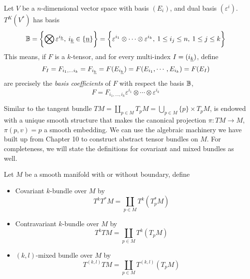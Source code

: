 \documentclass[../main-manifolds.tex]{subfiles}
\begin{document}
\begin{wts}[Basis of {$T^k(V^*)$}]
    Let $V$ be a $n$-dimensional vector space with basis $(E_i)$, and dual basis $(\varepsilon^i)$. $T^K(V^*)$ has basis
    \[
        \borel = \bigset{\bigotimes \varepsilon^{\Ul{i}[k]},\: \Ul{i}[k]\in \{\underline{n}\}} = \bigset{\varepsilon^{i_1}\otimes\cdots\otimes \varepsilon^{i_k},\: 1\leq i_j\leq n,\:  1\leq j\leq k}
    \]
    This means, if $F$ is a $k$-tensor, and for every multi-index $I = (\Ul{i}[k])$, define
    \[
        F_I = F_{i_1,\ldots i_k} = F_{\Ul{i}[k]} = F(E_{\Ul{i}[k]}) = F(E_{i_1},\cdots, E_{i_k}) = F(E_I)
    \]
    are precisely the \emph{basis coefficients} of $F$ with respect the basis ${\mathbb{B}}$, 
    \begin{equation}
        F = F_{i_1,\ldots, i_k}\varepsilon^{i_1}\otimes\cdots\otimes\varepsilon^{i_k}
    \end{equation}
\end{wts}
Similar to the tangent bundle $TM = \coprod_{p\in M}T_p M = \bigcup_{p\in M}\{p\}\times T_p M$, is endowed with a unique smooth structure that makes the canonical projection $\pi: TM\to M$, $\pi(p,v)=p$ a smooth embedding. We can use the algebraic machinery we have built up from Chapter 10 to construct abstract tensor bundles on $M$. For completeness, we will state the definitions for covariant and mixed bundles as well.
\begin{definition}\label{lee-chp12:tensor-bundles}
    Let $M$ be a smooth manifold with or without boundary, define
    \begin{itemize}
        \item Covariant $k$-bundle over $M$ by
        \[
            T^kT^*M = \coprod_{p\in M} T^k(T_p^*M)
        \]
        \item Contravariant $k$-bundle over $M$ by
        \[
            T^kTM = \coprod_{p\in M} T^k(T_pM)
        \]
        \item $(k,l)$-mixed bundle over $M$ by
        \[
            T^{(k,l)}TM = \coprod_{p\in M}T^{(k,l)}(T_pM)
        \]
    \end{itemize}
\end{definition}
\end{document}
